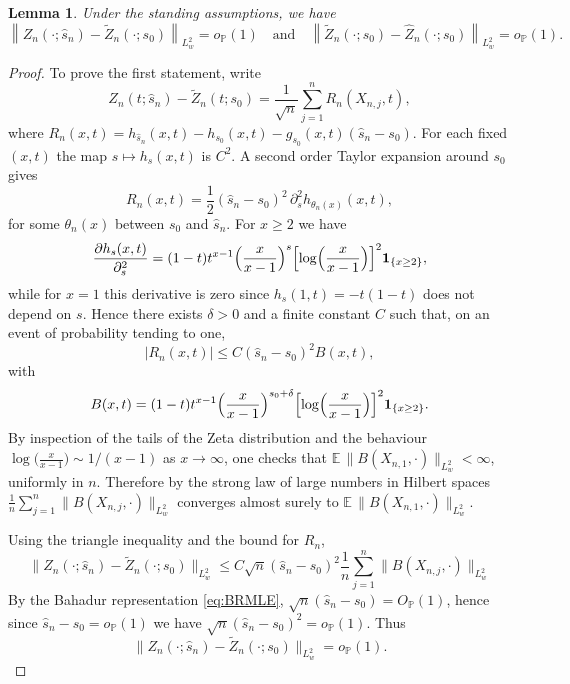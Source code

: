 \documentclass{article}
\theoremstyle{thm}
\newtheorem{lemma}[theorem]{Lemma}
\theoremstyle{def}
\begin{document}
\begin{lemma}\label{lem:asy_equiv}
Under the standing assumptions, we have
\begin{equation*}
\left\|Z_n(\cdot;\widehat{s}_n)-\widetilde{Z}_n(\cdot;s_0)\right\|_{L^2_w}=o_{\mathbb{P}}(1)\quad \mbox{and}\quad \left\|\widetilde{Z}_n(\cdot;s_0)-\widehat{Z}_n(\cdot;s_0)\right\|_{L^2_w}=o_{\mathbb{P}}(1).
\end{equation*}
\end{lemma}

\begin{proof}
To prove the first statement, write
\[
  Z_n(t;\widehat{s}_n)-\widetilde Z_n(t;s_0)
  = \frac{1}{\sqrt{n}} \sum_{j=1}^n
     R_n(X_{n,j},t),
\]
where $R_n(x,t)= h_{\widehat s_n}(x,t)-h_{s_0}(x,t)-g_{s_0}(x,t)(\widehat s_n-s_0)$.
For each fixed $(x,t)$ the map $s\mapsto h_s(x,t)$ is $C^2$. A second order
Taylor expansion around $s_0$ gives
\[
  R_n(x,t)
  = \frac12(\widehat{s}_n-s_0)^2\,\partial_s^2 h_{\theta_n(x)}(x,t),
\]
for some $\theta_n(x)$ between $s_0$ and $\widehat{s}_n$. For $x\ge2$ we have
\[
  \frac{\partial h_s(x,t)}{\partial_s^2}
  = (1-t)t^{x-1}\Big(\frac{x}{x-1}\Big)^s
      \Bigl[\log\Bigl(\frac{x}{x-1}\Bigr)\Bigr]^2\mathbf 1_{\{x\ge2\}},
\]
while for $x=1$ this derivative is zero since $h_s(1,t)=-t(1-t)$ does not
depend on $s$. Hence there exists $\delta>0$ and a finite constant $C$ such
that, on an event of probability tending to one,
\[
  \bigl|R_n(x,t)\bigr|
  \le C(\widehat{s}_n-s_0)^2 B(x,t),
\]
with
\[
  B(x,t)
  = (1-t)t^{x-1}\Big(\frac{x}{x-1}\Big)^{s_0+\delta}
       \Bigl[\log\Bigl(\frac{x}{x-1}\Bigr)\Bigr]^2\mathbf 1_{\{x\ge2\}}.
\]
By inspection of the tails of the Zeta distribution and the behaviour
$\log\!\bigl(\frac{x}{x-1}\bigr)\sim 1/(x-1)$ as $x\to\infty$, one checks
that $\mathbb{E}\,\bigl\|B(X_{n,1},\cdot)\bigr\|_{L_w^2}<\infty$,
uniformly in $n$. Therefore by the strong law of large numbers in Hilbert spaces $\frac{1}{n}\sum_{j=1}^n \bigl\|B(X_{n,j},\cdot)\bigr\|_{L_w^2}$ converges almost surely to $\mathbb{E}\,\bigl\|B(X_{n,1},\cdot)\bigr\|_{L_w^2}$.

Using the triangle inequality and the bound for $R_n$,
\[
  \bigl\|Z_n(\cdot;\widehat{s}_n)-\widetilde Z_n(\cdot;s_0)\bigr\|_{L_w^2}
  \le C\sqrt{n}(\widehat{s}_n-s_0)^2 \frac{1}{n}
        \sum_{j=1}^n \bigl\|B(X_{n,j},\cdot)\bigr\|_{L_w^2}
\]
By the Bahadur representation \eqref{eq:BRMLE},
$\sqrt{n}\left(\widehat{s}_n-s_0\right) = O_{\mathbb{P}}(1)$, hence since $\widehat{s}_n-s_0=o_{\mathbb{P}}(1)$ we have $\sqrt{n}(\widehat{s}_n-s_0)^2=o_{\mathbb{P}}(1)$. Thus
\[
  \bigl\|Z_n(\cdot;\widehat{s}_n)-\widetilde Z_n(\cdot;s_0)\bigr\|_{L_w^2}
  = o_{\mathbb{P}}(1).
\]


\end{proof}
\end{document}
